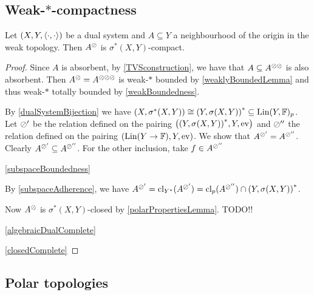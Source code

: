 \subsection{Weak-$*$-compactness}
\begin{theorem}
Let $(X,Y,\left\langle \cdot,\cdot \right\rangle)$ be a dual system and $A\subseteq Y$ a neighbourhood of the origin in the weak topology. Then $A^\oslash$ is $\sigma^*(X,Y)$-compact.
\end{theorem}
\begin{proof}
Since $A$ is absorbent, by \ref{TVSconstruction}, we have that $A\subseteq A^{\oslash\oslash}$ is also absorbent. Then $A^\oslash = A^{\oslash\oslash\oslash}$ is weak-$*$ bounded by \ref{weaklyBoundedLemma} and thus weak-$*$ totally bounded by \ref{weakBoundedness}.

By \ref{dualSystemBijection} we have $\left( X, \sigma^*(X,Y) \right) \cong {\left( Y, \sigma(X,Y) \right)}^* \subseteq \operatorname{Lin}(Y, \mathbb{F})_p$. Let $\oslash'$ be the relation defined on the pairing $\left( {\left( Y, \sigma(X,Y) \right)}^*,Y, \operatorname{ev} \right)$ and $\oslash^{\prime\prime}$ the relation defined on the pairing $\left( \operatorname{Lin}(Y\to \mathbb{F}),Y, \operatorname{ev} \right)$. We show that $A^{\oslash'} = A^{\oslash^{\prime\prime}}$. Clearly $A^{\oslash'} \subseteq A^{\oslash^{\prime\prime}}$. For the other inclusion, take $f\in A^{\oslash^{\prime\prime}}$



\ref{subspaceBoundedness}

By \ref{subspaceAdherence}, we have $A^{\oslash'} = \operatorname{cl}_{{Y}^*}(A^{\oslash'}) = \operatorname{cl}_p(A^{\oslash^{\prime\prime}}) \cap {\left( Y, \sigma(X,Y) \right)}^*$.

Now $A^\oslash$ is $\sigma^*(X,Y)$-closed by \ref{polarPropertiesLemma}. TODO!!

\ref{algebraicDualComplete}

\ref{closedComplete}
\end{proof}

\subsection{Polar topologies}

